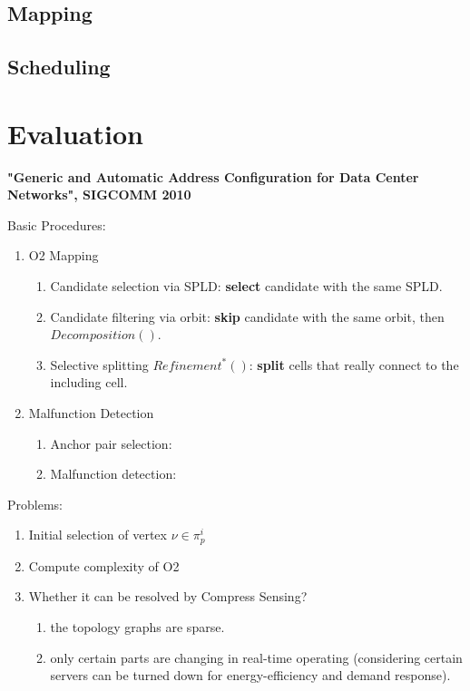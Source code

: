 \documentclass[journal,onecolumn,11pt]{IEEEtran}
\begin{document}
\subsection{Mapping}

\subsection{Scheduling}

\section{Evaluation}


\textbf{"Generic and Automatic Address Configuration for Data Center Networks", SIGCOMM 2010}

Basic Procedures:
\begin{enumerate}
  \item O2 Mapping
  \begin{enumerate}
    \item Candidate selection via SPLD: \textbf{select} candidate with the same SPLD.
    \item Candidate filtering via orbit: \textbf{skip} candidate with the same orbit, then $Decomposition()$.
    \item Selective splitting $Refinement^*()$: \textbf{split} cells that really connect to the including cell.
  \end{enumerate}
  \item Malfunction Detection
  \begin{enumerate}
    \item Anchor pair selection:
    \item Malfunction detection:
  \end{enumerate}
\end{enumerate}

Problems:
\begin{enumerate}
  \item Initial selection of vertex $\nu\in\pi_p^i$
  \item Compute complexity of O2
  \item Whether it can be resolved by Compress Sensing?
  \begin{enumerate}
    \item the topology graphs are sparse.
    \item only certain parts are changing in real-time operating (considering certain servers can be turned down for energy-efficiency and demand response).
  \end{enumerate}
\end{enumerate}
\end{document}
